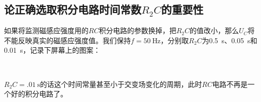 \documentclass[UTF8]{ctexart}
\begin{document}
\subsection{论正确选取积分电路时间常数$R_2C$的重要性}
如果将监测磁感应强度用的$RC$积分电路的参数换掉，把$R_2C$的值改小，那么$U_C$将不能反映真实的磁感应强度值。我们保持$f=\SI{50}{\Hz}$，分别取$R_2C$为\SI{.5}{s}、\SI{.05}{s}和\SI{.01}{s}，记录下屏幕上的图案：
\begin{figure}[h]
  \centering
  \hfill
  \hfill
  \\
\end{figure}
$R_2C=\SI{.01}{\s}$的话这个时间常量甚至小于交变场变化的周期，此时$RC$电路不再是一个好的积分电路了。
\end{document}
